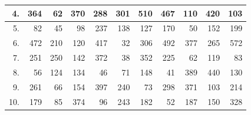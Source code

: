 \begin{table}[H]
{\begin{tabular}{|r|r|r|r|r|r|r|r|r|r|r|}
4.                     & 364                            & 62                              & 370                              & 288                              & 301                              & 510                              & 467                              & 110                              & 420                              & 103                              \\ \hline
5.                     & 82                             & 45                              & 98                               & 237                              & 138                              & 127                              & 170                              & 50                               & 152                              & 199                              \\ \hline
6.                     & 472                            & 210                             & 120                              & 417                              & 32                               & 306                              & 492                              & 377                              & 265                              & 572                              \\ \hline
7.                     & 251                            & 250                             & 142                              & 372                              & 38                               & 352                              & 225                              & 62                               & 119                              & 83                               \\ \hline
8.                     & 56                             & 124                             & 134                              & 46                               & 71                               & 148                              & 41                               & 389                              & 440                              & 130                              \\ \hline
9.                     & 261                            & 66                              & 154                              & 397                              & 240                              & 73                               & 298                              & 371                              & 103                              & 214                              \\ \hline
10.                    & 179                            & 85                              & 374                              & 96                               & 243                              & 182                              & 52                               & 187                              & 150                              & 328                              \\ \hline

\end{tabular}}
\end{table}
